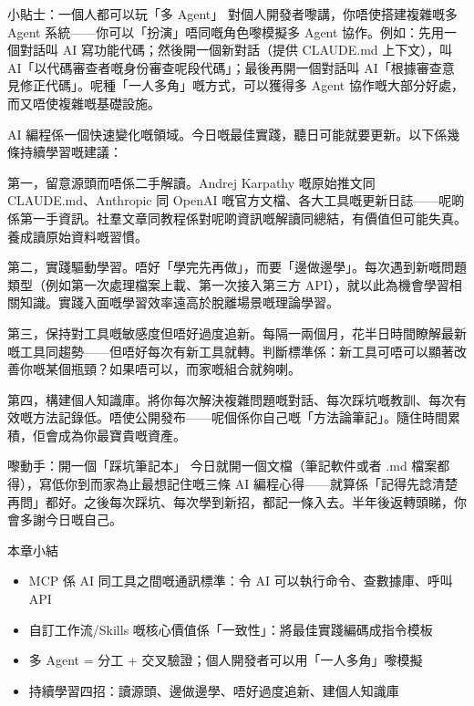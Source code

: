\begin{tcbinfo}{小貼士：一個人都可以玩「多 Agent」}
對個人開發者嚟講，你唔使搭建複雜嘅多 Agent 系統——你可以「扮演」唔同嘅角色嚟模擬多 Agent 協作。例如：先用一個對話叫 AI 寫功能代碼；然後開一個新對話（提供 CLAUDE.md 上下文），叫 AI「以代碼審查者嘅身份審查呢段代碼」；最後再開一個對話叫 AI「根據審查意見修正代碼」。呢種「一人多角」嘅方式，可以獲得多 Agent 協作嘅大部分好處，而又唔使複雜嘅基礎設施。

\end{tcbinfo}


AI 編程係一個快速變化嘅領域。今日嘅最佳實踐，聽日可能就要更新。以下係幾條持續學習嘅建議：

第一，留意源頭而唔係二手解讀。Andrej Karpathy 嘅原始推文同 CLAUDE.md、Anthropic 同 OpenAI 嘅官方文檔、各大工具嘅更新日誌——呢啲係第一手資訊。社羣文章同教程係對呢啲資訊嘅解讀同總結，有價值但可能失真。養成讀原始資料嘅習慣。

第二，實踐驅動學習。唔好「學完先再做」，而要「邊做邊學」。每次遇到新嘅問題類型（例如第一次處理檔案上載、第一次接入第三方 API），就以此為機會學習相關知識。實踐入面嘅學習效率遠高於脫離場景嘅理論學習。

第三，保持對工具嘅敏感度但唔好過度追新。每隔一兩個月，花半日時間瞭解最新嘅工具同趨勢——但唔好每次有新工具就轉。判斷標準係：新工具可唔可以顯著改善你嘅某個瓶頸？如果唔可以，而家嘅組合就夠喇。

第四，構建個人知識庫。將你每次解決複雜問題嘅對話、每次踩坑嘅教訓、每次有效嘅方法記錄低。唔使公開發布——呢個係你自己嘅「方法論筆記」。隨住時間累積，佢會成為你最寶貴嘅資產。

\begin{tcbpractice}{嚟動手：開一個「踩坑筆記本」}
今日就開一個文檔（筆記軟件或者 .md 檔案都得），寫低你到而家為止最想記住嘅三條 AI 編程心得——就算係「記得先諗清楚再問」都好。之後每次踩坑、每次學到新招，都記一條入去。半年後返轉頭睇，你會多謝今日嘅自己。

\end{tcbpractice}

\begin{tcbsummary}{本章小結}
\begin{itemize}
  \item MCP 係 AI 同工具之間嘅通訊標準：令 AI 可以執行命令、查數據庫、呼叫 API
  \item 自訂工作流/Skills 嘅核心價值係「一致性」：將最佳實踐編碼成指令模板
  \item 多 Agent = 分工 + 交叉驗證；個人開發者可以用「一人多角」嚟模擬
  \item 持續學習四招：讀源頭、邊做邊學、唔好過度追新、建個人知識庫
\end{itemize}

\end{tcbsummary}
